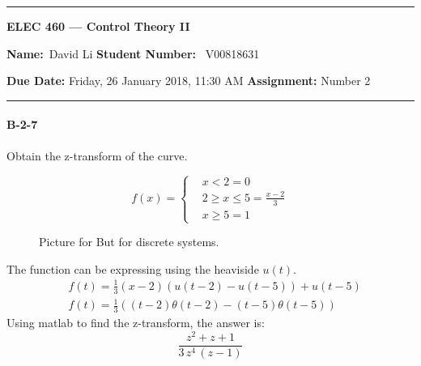 \begin{center}
	\hrule
	\vspace{.4cm}
	{\textbf { \large ELEC 460 --- Control Theory II}}
\end{center}
{\textbf{Name:}\ David Li \hspace{\fill} \textbf{Student Number:}} \ V00818631  \\
{\textbf{Due Date:} Friday, 26 January 2018, 11:30 AM \hspace{\fill} \textbf{Assignment:} Number 2 \\
	\hrule
	
\paragraph{B-2-7}
Obtain the z-transform of the curve.

\[
f(x)=
\begin{cases}
& x < 2  = 0\\
& 2 \geq x \leq 5 = \frac{x-2}{3} \\
& x \geq 5 = 1
\end{cases}
\]
 \vspace{-1cm}
\begin{figure}[H]
	\begin{lateximage}
	\end{lateximage}
	\caption{Picture for \cite{textbook:ogata} But for discrete systems.}
\end{figure}

The function can be expressing using the heaviside $u(t)$.
\begin{align*}
& f(t) = \frac{1}{3}(x-2) (u(t-2)-u(t-5)) + u(t-5) \\
& f(t) = \frac{1}{3}((t-2)\theta(t-2)-(t-5)\theta(t-5)) 
\end{align*}
Using matlab to find the z-transform, the answer is:
\[
\frac{z^2+z+1}{3\,z^4\,\left(z-1\right)}
\]

}
